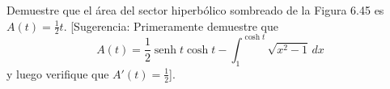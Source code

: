 \item Demuestre que el área del sector hiperbólico sombreado de la Figura 6.45 es $A(t) = \frac{1}{2}t$. [Sugerencia: Primeramente demuestre que
    $$A(t) = \frac{1}{2}\operatorname{senh} t \cosh t - \int_1^{\cosh t} \sqrt{x^2 - 1} \, dx$$
    y luego verifique que $A'(t) = \frac{1}{2}$].

